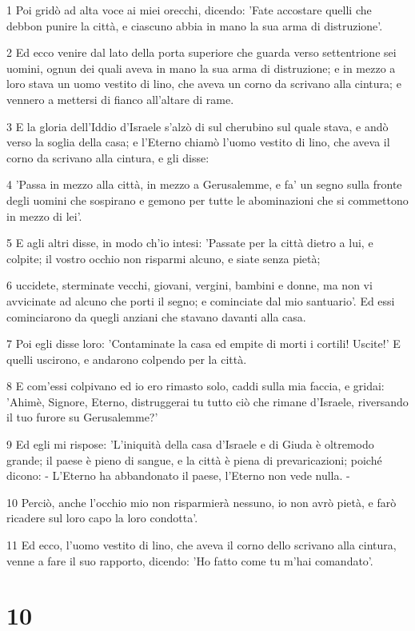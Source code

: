 \par 1 Poi gridò ad alta voce ai miei orecchi, dicendo: 'Fate accostare quelli che debbon punire la città, e ciascuno abbia in mano la sua arma di distruzione'.
\par 2 Ed ecco venire dal lato della porta superiore che guarda verso settentrione sei uomini, ognun dei quali aveva in mano la sua arma di distruzione; e in mezzo a loro stava un uomo vestito di lino, che aveva un corno da scrivano alla cintura; e vennero a mettersi di fianco all'altare di rame.
\par 3 E la gloria dell'Iddio d'Israele s'alzò di sul cherubino sul quale stava, e andò verso la soglia della casa; e l'Eterno chiamò l'uomo vestito di lino, che aveva il corno da scrivano alla cintura, e gli disse:
\par 4 'Passa in mezzo alla città, in mezzo a Gerusalemme, e fa' un segno sulla fronte degli uomini che sospirano e gemono per tutte le abominazioni che si commettono in mezzo di lei'.
\par 5 E agli altri disse, in modo ch'io intesi: 'Passate per la città dietro a lui, e colpite; il vostro occhio non risparmi alcuno, e siate senza pietà;
\par 6 uccidete, sterminate vecchi, giovani, vergini, bambini e donne, ma non vi avvicinate ad alcuno che porti il segno; e cominciate dal mio santuario'. Ed essi cominciarono da quegli anziani che stavano davanti alla casa.
\par 7 Poi egli disse loro: 'Contaminate la casa ed empite di morti i cortili! Uscite!' E quelli uscirono, e andarono colpendo per la città.
\par 8 E com'essi colpivano ed io ero rimasto solo, caddi sulla mia faccia, e gridai: 'Ahimè, Signore, Eterno, distruggerai tu tutto ciò che rimane d'Israele, riversando il tuo furore su Gerusalemme?'
\par 9 Ed egli mi rispose: 'L'iniquità della casa d'Israele e di Giuda è oltremodo grande; il paese è pieno di sangue, e la città è piena di prevaricazioni; poiché dicono: - L'Eterno ha abbandonato il paese, l'Eterno non vede nulla. -
\par 10 Perciò, anche l'occhio mio non risparmierà nessuno, io non avrò pietà, e farò ricadere sul loro capo la loro condotta'.
\par 11 Ed ecco, l'uomo vestito di lino, che aveva il corno dello scrivano alla cintura, venne a fare il suo rapporto, dicendo: 'Ho fatto come tu m'hai comandato'.

\chapter{10}

